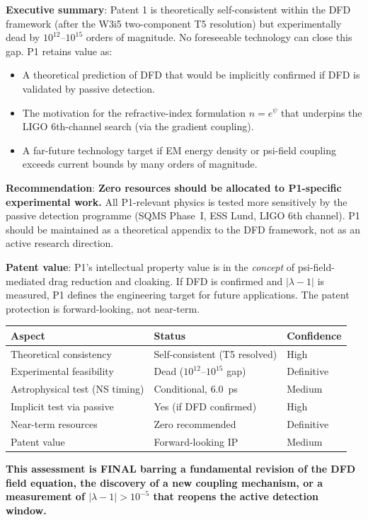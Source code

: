 \documentclass[11pt]{article}
\newcommand{\lam}{\lambda}
\newcommand{\lbone}{|\lam - 1|}
\theoremstyle{definition}
\theoremstyle{remark}
\begin{document}
\begin{tcolorbox}[colback=blue!5!white, colframe=blue!60!black,
  title=\textbf{PATENT 1: DEFINITIVE FINAL ASSESSMENT (W3i7)}]

\textbf{Executive summary}: Patent 1 is theoretically self-consistent
within the DFD framework (after the W3i5 two-component T5 resolution)
but experimentally dead by $10^{12}$--$10^{15}$ orders of magnitude.
No foreseeable technology can close this gap. P1 retains value as:
\begin{itemize}[nosep]
\item A theoretical prediction of DFD that would be implicitly confirmed
  if DFD is validated by passive detection.
\item The motivation for the refractive-index formulation $n = e^\psi$
  that underpins the LIGO 6th-channel search (via the gradient coupling).
\item A far-future technology target if EM energy density or psi-field
  coupling exceeds current bounds by many orders of magnitude.
\end{itemize}

\textbf{Recommendation}: \textbf{Zero resources should be allocated
to P1-specific experimental work.} All P1-relevant physics is tested
more sensitively by the passive detection programme (SQMS Phase~I,
ESS Lund, LIGO 6th channel). P1 should be maintained as a theoretical
appendix to the DFD framework, not as an active research direction.

\textbf{Patent value}: P1's intellectual property value is in the
\emph{concept} of psi-field-mediated drag reduction and cloaking.
If DFD is confirmed and $\lbone$ is measured, P1 defines the
engineering target for future applications. The patent protection
is forward-looking, not near-term.

\begin{center}
\renewcommand{\arraystretch}{1.3}
\begin{tabular}{@{}lll@{}}
\toprule
\textbf{Aspect} & \textbf{Status} & \textbf{Confidence} \\
\midrule
Theoretical consistency & Self-consistent (T5 resolved) & High \\
Experimental feasibility & Dead ($10^{12}$--$10^{15}$ gap) & Definitive \\
Astrophysical test (NS timing) & Conditional, 6.0~ps & Medium \\
Implicit test via passive & Yes (if DFD confirmed) & High \\
Near-term resources & Zero recommended & Definitive \\
Patent value & Forward-looking IP & Medium \\
\bottomrule
\end{tabular}
\end{center}

\textbf{This assessment is FINAL barring a fundamental revision of
the DFD field equation, the discovery of a new coupling mechanism,
or a measurement of $\lbone > 10^{-5}$ that reopens the active
detection window.}
\end{tcolorbox}
\end{document}
